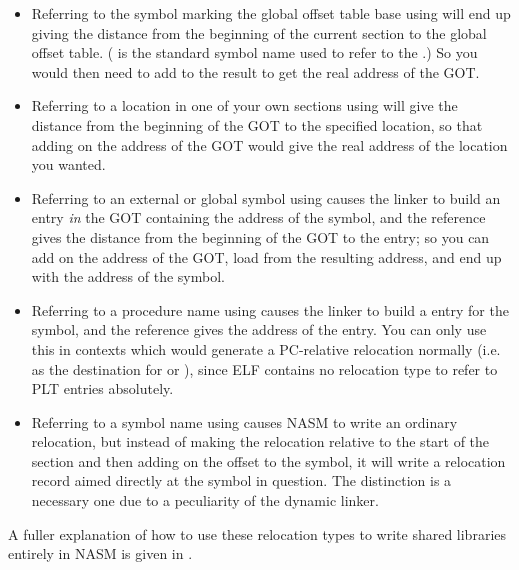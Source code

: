 \begin{itemize}
    \item{Referring to the symbol marking the global offset table base
        using  will end up giving the distance from the
        beginning of the current section to the global offset table.
        ( is the standard symbol name
        used to refer to the .) So you would then need to add
        \codeindex{\$\$} to the result to get the real address of the GOT.}

    \item{Referring to a location in one of your own sections using
         will give the distance from the beginning of
        the GOT to the specified location, so that adding on the address
        of the GOT would give the real address of the location you wanted.}

    \item{Referring to an external or global symbol using 
        causes the linker to build an entry \emph{in} the GOT containing the
        address of the symbol, and the reference gives the distance from the
        beginning of the GOT to the entry; so you can add on the address of
        the GOT, load from the resulting address, and end up with the
        address of the symbol.}

    \item{Referring to a procedure name using  causes the
        linker to build a  entry for the symbol,
        and the reference gives the address of the  entry. You can
        only use this in contexts which would generate a PC-relative
        relocation normally (i.e. as the destination for  or
        ), since ELF contains no relocation type to refer to PLT
        entries absolutely.}

    \item{Referring to a symbol name using  causes NASM to
        write an ordinary relocation, but instead of making the relocation
        relative to the start of the section and then adding on the offset
        to the symbol, it will write a relocation record aimed directly at
        the symbol in question. The distinction is a necessary one due to a
        peculiarity of the dynamic linker.}
\end{itemize}

A fuller explanation of how to use these relocation types to write
shared libraries entirely in NASM is given in .

